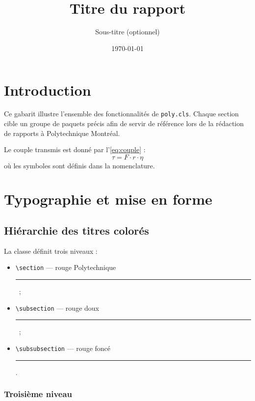 \documentclass{poly}
\title{Titre du rapport}
\subtitle{Sous-titre (optionnel)}
\date{\today}
\begin{document}
\maketitle   %
\tableofcontents
\printnomenclature %
\listoffigures
\listoftables

\newpage
{}
\setcounter{page}{1}

\section{Introduction}

Ce gabarit illustre l'ensemble des fonctionnalités de \texttt{poly.cls}.
Chaque section cible un groupe de paquets précis afin de servir de
référence lors de la rédaction de rapports à Polytechnique Montréal.

Le couple transmis est donné par l'\cref{eq:couple} :
\begin{equation}
    \tau = F \cdot r \cdot \eta
    \label{eq:couple}
\end{equation}
où les symboles sont définis dans la nomenclature.

\section{Typographie et mise en forme}

\subsection{Hiérarchie des titres colorés}

La classe définit trois niveaux :
\begin{itemize}[label=\textbullet, noitemsep]
    \item \texttt{\textbackslash section} — rouge Polytechnique
          \textcolor{titre}{\rule{0.8em}{0.8ex}}~;
    \item \texttt{\textbackslash subsection} — rouge doux
          \textcolor{soustitre}{\rule{0.8em}{0.8ex}}~;
    \item \texttt{\textbackslash subsubsection} — rouge foncé
          \textcolor{sousoustitre}{\rule{0.8em}{0.8ex}}.
\end{itemize}

\subsubsection{Troisième niveau}
\end{document}
